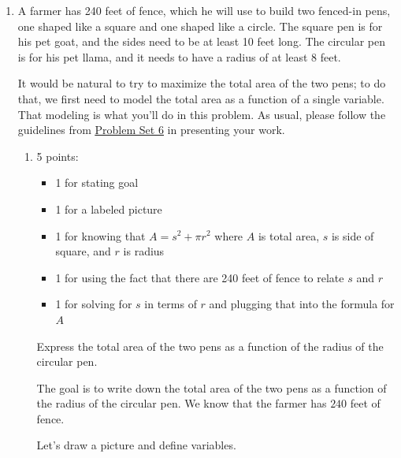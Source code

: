 \documentclass{article}
\makeatletter
\let\@href=\href
\renewcommand{\href}[2]{\@href{#1}{\ul{#2}}}
\makeatother
\begin{document}
\begin{enumerate}
\begin{enumerate}
  \end{enumerate}

\item  

  A farmer has 240 feet of fence, which he will use to build two fenced-in pens, one shaped like a square and one shaped like a circle. The square pen is for his pet goat, and the sides need to be at least 10 feet long. The circular pen is for his pet llama, and it needs to have a radius of at least 8 feet.

  It would be natural to try to maximize the total area of the two pens; to do that, we first need to model the total area as a function of a single variable. That modeling is what you'll do in this problem. As usual, please follow the guidelines from \href{https://people.math.harvard.edu/~jjchen/mathma/docs/homework/PS06.html}{Problem Set 6} in presenting your work. 

  \begin{enumerate}
  \item
    \begin{grading}
      5 points:
      \begin{itemize}[nosep]
      \item 1 for stating goal
      \item 1 for a labeled picture
      \item 1 for knowing that $A = s^2 + \pi r^2$ where $A$ is total area, $s$ is side of square, and $r$ is radius
      \item 1 for using the fact that there are 240 feet of fence to relate $s$ and $r$
      \item 1 for solving for $s$ in terms of $r$ and plugging that into the formula for $A$
      \end{itemize}
    \end{grading}

    \begin{problem}[\vfill]
      Express the total area of the two pens as a function of the radius of the circular pen.
    \end{problem}

    \begin{solution}
      The goal is to write down the total area of the two pens as a function of the 
      radius of the circular pen. We know that the farmer has $240$ feet of fence.

      Let's draw a picture and define variables.

      \begin{center}
      \end{center}


\end{solution}
\end{enumerate}
\end{enumerate}
\end{document}
